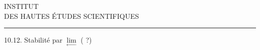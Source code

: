 \begin{center}
INSTITUT\\
DES HAUTES ÉTUDES SCIENTIFIQUES\\[-.3ex]
\rule{1.3cm}{.4pt}
\end{center}

10.12. Stabilité par $\underset{\longleftarrow}{\lim}$ ( ?)

